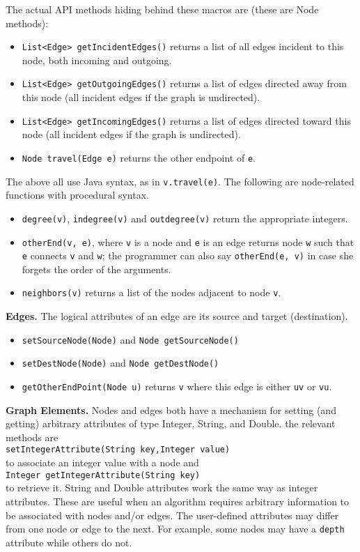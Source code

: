 The actual API methods hiding behind these macros are (these are Node methods):

\begin{itemize}
\item
\texttt{List<Edge>~getIncidentEdges()} returns a list of all edges incident to this node,
both incoming and outgoing.
\item
\texttt{List<Edge>~getOutgoingEdges()} returns a list of edges directed away
from this node (all incident edges if the graph is undirected).
\item
\texttt{List<Edge>~getIncomingEdges()} returns a list of edges directed toward
this node (all incident edges if the graph is undirected).
\item
\texttt{Node~travel(Edge~e)} returns the other endpoint of \texttt{e}.
\end{itemize}

The above all use Java syntax, as in \texttt{v.travel(e)}.
The following are node-related functions with procedural syntax.

\begin{itemize}
\item \texttt{degree(v)}, \texttt{indegree(v)} and \texttt{outdegree(v)} return the appropriate
integers.
\item \texttt{otherEnd(v, e)}, where \texttt{v} is a node and \texttt{e} is an edge
returns node \texttt{w} such that \texttt{e} connects \texttt{v} and \texttt{w};
the programmer can also say \texttt{otherEnd(e, v)} in case she forgets the order
of the arguments.
\item \texttt{neighbors(v)} returns a list of the nodes adjacent to node \texttt{v}.
\end{itemize}

\bigskip
\textbf{Edges.}
The logical attributes of an edge are its source and target (destination).

\begin{itemize}
\item
\texttt{setSourceNode(Node)} and \texttt{Node~getSourceNode()}
\item
\texttt{setDestNode(Node)} and \texttt{Node~getDestNode()}
\item
\texttt{getOtherEndPoint(Node~u)} returns \texttt{v} where this edge is
either \texttt{uv} or \texttt{vu}.
\end{itemize}

\bigskip
\textbf{Graph Elements.}
Nodes and edges both have a mechanism for setting (and getting)
arbitrary attributes of type Integer, String, and Double.
the relevant methods are\\
\texttt{setIntegerAttribute(String~key,Integer~value)}\\ 
to associate an integer value with a node and\\
\texttt{Integer~getIntegerAttribute(String~key)}\\
to retrieve it.
String and Double attributes work the same way as integer attributes.
These are useful when an algorithm requires arbitrary information to be
associated with nodes and/or edges.
The user-defined attributes may differ from one node or edge to the next.
For example, some nodes may have a \texttt{depth} attribute while others do not.

